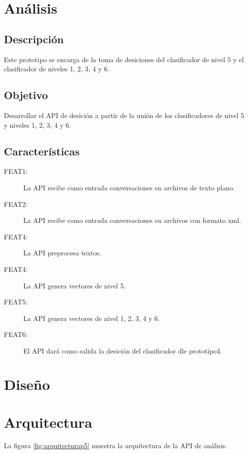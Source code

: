 \section{An\'alisis}

\subsection{Descripci\'on}
Este prototipo se encarga de la toma de desiciones del clasificador de nivel 5 y el clasificador de niveles  1, 2, 3, 4 y 6.

\subsection{Objetivo}
Desarrollar el API de desici\'on a partir de la uni\'on de los clasificadores de nivel 5 y niveles 1, 2, 3, 4 y 6.

\subsection{Caracter\'isticas}
\begin{description}
\item[FEAT1:] La API recibe como entrada conversaciones en archivos de texto plano.
\item[FEAT2:] La API recibe como entrada conversaciones en archivos con formato xml.
\item[FEAT4:] La API preprocesa textos.
\item[FEAT4:] La API genera vectores de nivel 5.
\item[FEAT5:] La API genera vectores de nivel  1, 2, 3, 4 y 6.
\item[FEAT6:] El API dar\'a como salida la desici\'on del clasificador dle prototipo4.

\end{description}

\section{Dise\~no}


\section{Arquitectura}

La figura \ref{fig:arquitecturap5} muestra la arquitectura de la API de an\'alisis.

